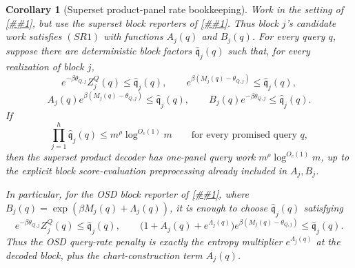 \documentclass[10pt]{article}
\newcommand{\cref}[1]{\ref{##1}}
\newtheorem{corollary}[theorem]{Corollary}
\theoremstyle{definition}
\begin{document}
\begin{corollary}[Superset product-panel rate bookkeeping]
   \label{cor:superset-product-panel-rate-bookkeeping}
   Work in the setting of \cref{lem:product-panel-tensorization}, but use the
   superset block reporters of \cref{lem:superset-product-panel-decoder}.  Thus
   block \(j\)'s candidate work satisfies \((SR1)\) with functions
   \(A_j(q)\) and \(B_j(q)\).  For every query \(q\), suppose there are
   deterministic block factors \(\widehat{\mathfrak q}_j(q)\) such that, for
   every realization of block \(j\),
   \[
      e^{-\beta\theta_{Q,j}}Z_j^Q(q)
      \le\widehat{\mathfrak q}_j(q),
      \qquad
      e^{\beta(M_j(q)-\theta_{Q,j})}
      \le\widehat{\mathfrak q}_j(q),
      \tag{SRB1}
   \]
   \[
      A_j(q)e^{\beta(M_j(q)-\theta_{Q,j})}
      \le\widehat{\mathfrak q}_j(q),
      \qquad
      B_j(q)e^{-\beta\theta_{Q,j}}
      \le\widehat{\mathfrak q}_j(q).
      \tag{SRB2}
   \]
   If
   \[
      \prod_{j=1}^h\widehat{\mathfrak q}_j(q)
      \le m^\rho\log^{O_c(1)}m
      \qquad\text{for every promised query }q,
      \tag{SRB3}
   \]
   then the superset product decoder has one-panel query work
   \(m^\rho\log^{O_c(1)}m\), up to the explicit block score-evaluation
   preprocessing already included in \(A_j,B_j\).

   In particular, for the OSD block reporter of
   \cref{cor:osd-superset-block-reporter}, where
   \(B_j(q)=\exp(\beta M_j(q)+\Lambda_j(q))\), it is enough to choose
   \(\widehat{\mathfrak q}_j(q)\) satisfying
   \[
      e^{-\beta\theta_{Q,j}}Z_j^Q(q)
      \le\widehat{\mathfrak q}_j(q),
      \qquad
      \bigl(1+A_j(q)+e^{\Lambda_j(q)}\bigr)
      e^{\beta(M_j(q)-\theta_{Q,j})}
      \le\widehat{\mathfrak q}_j(q).
      \tag{SRB4}
   \]
   Thus the OSD query-rate penalty is exactly the entropy multiplier
   \(e^{\Lambda_j(q)}\) at the decoded block, plus the chart-construction term
   \(A_j(q)\).
\end{corollary}
\end{document}
